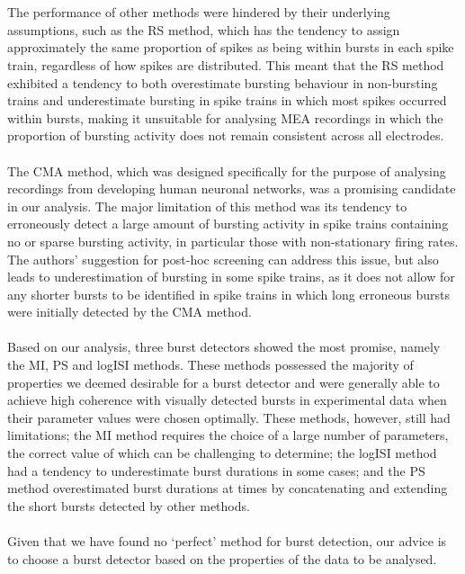 \documentclass[12pt, titlepage]{article}
\begin{document}
	\\ \\The performance of other methods were hindered by their underlying assumptions, such as the RS method, which has the tendency to assign approximately the same proportion of spikes as being within bursts in each spike train, regardless of how spikes are distributed. This meant that the RS method exhibited a tendency to both overestimate bursting behaviour in non-bursting trains and underestimate bursting in spike trains in which most spikes occurred within bursts, making it unsuitable for analysing MEA recordings in which the proportion of bursting activity does not remain consistent across all electrodes.
	\\ \\The CMA method, which was designed specifically for the purpose of analysing recordings from developing human neuronal networks, was a promising candidate in our analysis. The major limitation of this method was its tendency to erroneously detect a large amount of bursting activity in spike trains containing no or sparse bursting activity, in particular those with non-stationary firing rates.  The authors’ suggestion for post-hoc screening can address this issue, but also leads to underestimation of bursting in some spike trains, as it does not allow for any shorter bursts to be identified in spike trains in which long erroneous bursts were initially detected by the CMA method. 
	\\ \\ Based on our analysis, three burst detectors showed the most promise, namely the MI, PS and logISI methods. These methods possessed the majority of properties we deemed desirable for a burst detector and were generally able to achieve high coherence with visually detected bursts in experimental data when their parameter values were chosen optimally. These methods, however, still had limitations; the MI method requires the choice of a large number of parameters, the correct value of which can be challenging to determine; the logISI method had a tendency to underestimate burst durations in some cases; and the PS method overestimated burst durations at times by concatenating and extending the short bursts detected by other methods.
	\\ \\Given that we have found no `perfect' method for burst detection, our advice is to choose a burst detector based on the properties of the data to be analysed. 
\end{document}
